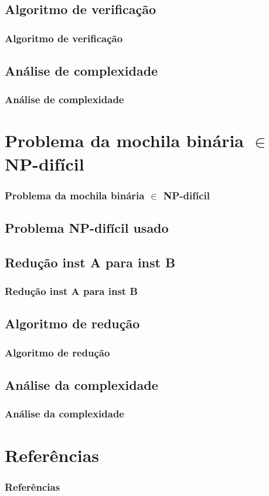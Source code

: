 \documentclass{beamer}
\begin{document}
\subsection{Algoritmo de verificação}
\begin{frame}
\frametitle{Algoritmo de verificação}
\end{frame}

\subsection{Análise de complexidade}
\begin{frame}
\frametitle{Análise de complexidade}
\end{frame}


\section{Problema da mochila binária $\in$ NP-difícil}
\begin{frame}
\frametitle{Problema da mochila binária $\in$ NP-difícil}
\end{frame}

\subsection{Problema NP-difícil usado}
\begin{frame}
\frametitle{}
\end{frame}

\subsection{Redução inst A para inst B}
\begin{frame}
\frametitle{Redução inst A para inst B}
\end{frame}

\subsection{Algoritmo de redução}
\begin{frame}
\frametitle{Algoritmo de redução}
\end{frame}

\subsection{Análise da complexidade}
\begin{frame}
\frametitle{Análise da complexidade}
\end{frame}

\section{Referências}
\begin{frame}
\frametitle{Referências}
\end{frame}
\end{document}
